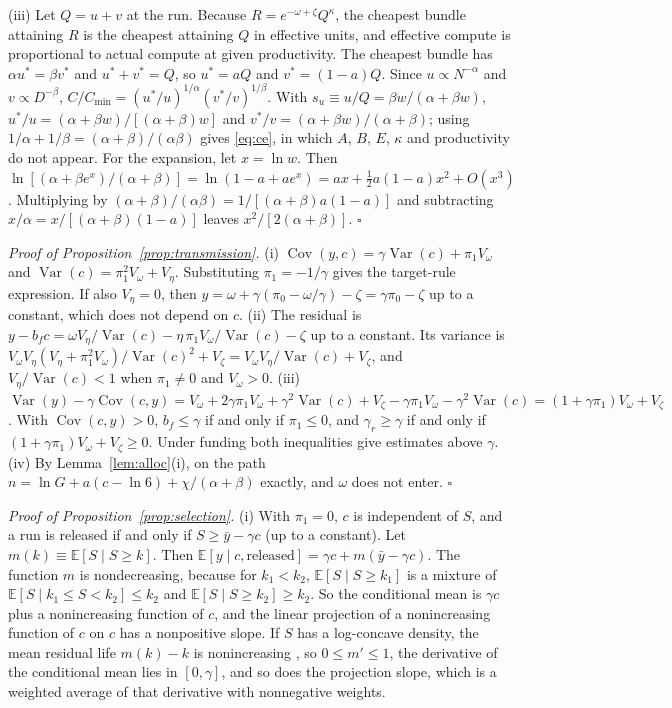 \documentclass[AER,finalmode]{AEA}
\theoremstyle{definition}
\theoremstyle{remark}
\providecommand{\E}{\mathbb{E}}
\providecommand{\Var}{\operatorname{Var}}
\providecommand{\Cov}{\operatorname{Cov}}
\begin{document}
(iii) Let $Q=u+v$ at the run. Because $R=e^{-\omega+\zeta}Q^\kappa$, the cheapest bundle attaining $R$ is the cheapest
attaining $Q$ in effective units, and effective compute is proportional to actual compute at given productivity. The
cheapest bundle has $\alpha u^*=\beta v^*$ and $u^*+v^*=Q$, so $u^*=aQ$ and $v^*=(1-a)Q$. Since $u\propto N^{-\alpha}$
and $v\propto D^{-\beta}$, $C/C_{\min}=(u^*/u)^{1/\alpha}(v^*/v)^{1/\beta}$. With $s_u\equiv u/Q=\beta w/(\alpha+\beta
w)$, $u^*/u=(\alpha+\beta w)/[(\alpha+\beta)w]$ and $v^*/v=(\alpha+\beta w)/(\alpha+\beta)$; using
$1/\alpha+1/\beta=(\alpha+\beta)/(\alpha\beta)$ gives \eqref{eq:ce}, in which $A$, $B$, $E$, $\kappa$ and productivity
do not appear. For the expansion, let $x=\ln w$. Then $\ln[(\alpha+\beta e^x)/(\alpha+\beta)]=\ln(1-a+ae^x)
=ax+\tfrac12a(1-a)x^2+O(x^3)$. Multiplying by $(\alpha+\beta)/(\alpha\beta)=1/[(\alpha+\beta)a(1-a)]$ and subtracting
$x/\alpha=x/[(\alpha+\beta)(1-a)]$ leaves $x^2/[2(\alpha+\beta)]$. $\square$

\textit{Proof of Proposition~\ref{prop:transmission}.} (i) $\Cov(y,c)=\gamma\Var(c)+\pi_1V_\omega$ and
$\Var(c)=\pi_1^2V_\omega+V_\eta$. Substituting $\pi_1=-1/\gamma$ gives the target-rule expression. If also $V_\eta=0$,
then $y=\omega+\gamma(\pi_0-\omega/\gamma)-\zeta=\gamma\pi_0-\zeta$ up to a constant, which does not depend on $c$.
(ii) The residual is $y-b_fc=\omega V_\eta/\Var(c)-\eta\,\pi_1V_\omega/\Var(c)-\zeta$ up to a constant. Its variance
is $V_\omega V_\eta(V_\eta+\pi_1^2V_\omega)/\Var(c)^2+V_\zeta=V_\omega V_\eta/\Var(c)+V_\zeta$, and
$V_\eta/\Var(c)<1$ when $\pi_1\neq0$ and $V_\omega>0$. (iii) $\Var(y)-\gamma\Cov(c,y)
=V_\omega+2\gamma\pi_1V_\omega+\gamma^2\Var(c)+V_\zeta-\gamma\pi_1V_\omega-\gamma^2\Var(c)=(1+\gamma\pi_1)V_\omega+V_\zeta$.
With $\Cov(c,y)>0$, $b_f\le\gamma$ if and only if $\pi_1\le0$, and $\gamma_r\ge\gamma$ if and only if
$(1+\gamma\pi_1)V_\omega+V_\zeta\ge0$. Under funding both inequalities give estimates above $\gamma$. (iv) By
Lemma~\ref{lem:alloc}(i), on the path $n=\ln G+a(c-\ln6)+\chi/(\alpha+\beta)$ exactly, and $\omega$ does not enter. $\square$

\textit{Proof of Proposition~\ref{prop:selection}.} (i) With $\pi_1=0$, $c$ is independent of $S$, and a run is released
if and only if $S\ge\bar y-\gamma c$ (up to a constant). Let $m(k)\equiv\E[S\mid S\ge k]$. Then
$\E[y\mid c,\text{released}]=\gamma c+m(\bar y-\gamma c)$. The function $m$ is nondecreasing, because for $k_1<k_2$,
$\E[S\mid S\ge k_1]$ is a mixture of $\E[S\mid k_1\le S<k_2]\le k_2$ and $\E[S\mid S\ge k_2]\ge k_2$. So the conditional
mean is $\gamma c$ plus a nonincreasing function of $c$, and the linear projection of a nonincreasing function of $c$
on $c$ has a nonpositive slope. If $S$ has a log-concave density, the mean residual life $m(k)-k$ is nonincreasing
\citep{bagnoli2005logconcave}, so $0\le m'\le1$, the derivative of the conditional mean lies in $[0,\gamma]$, and so
does the projection slope, which is a weighted average of that derivative with nonnegative weights.
\end{document}
